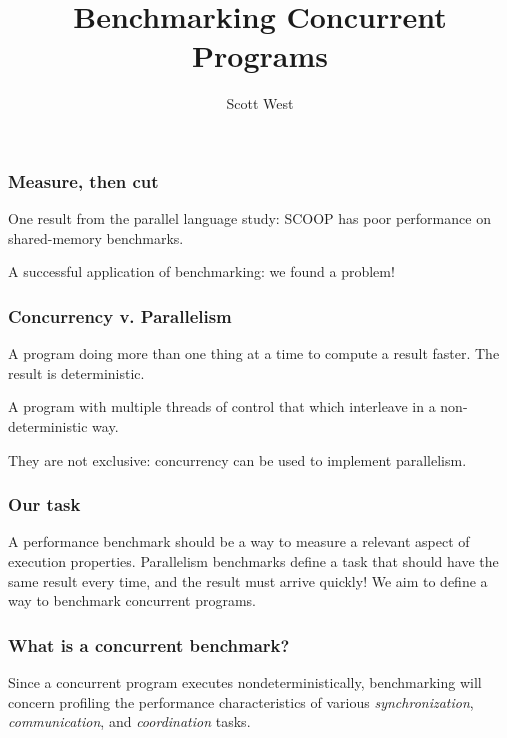 \documentclass{beamer}
\title{Benchmarking Concurrent Programs}
\author{Scott West}
\institute{ETH Z\"{u}rich}
\newcommand{\skipp}[0]{\vskip 0.5cm}
\newcommand{\skippause}[0]{\skipp \pause}
\begin{document}
\maketitle

\begin{frame}
  \frametitle{Measure, then cut}
  One result from the parallel language study:
  SCOOP has poor performance on shared-memory benchmarks.

  \skippause

  A successful application of benchmarking: we found a problem!
\end{frame}

\begin{frame}
  \frametitle{Concurrency v. Parallelism}
  \begin{definition}[Parallelism]
    A program doing more than one thing at a time to compute a result faster.
    The result is deterministic.
  \end{definition}

  \begin{definition}[Concurrency]
    A program with multiple threads of control that which 
    interleave in a non-deterministic way.
  \end{definition}

  They are not exclusive: concurrency can be used to implement parallelism.
\end{frame}

\begin{frame}
  \frametitle {Our task}
  A performance benchmark should be a way to measure a relevant aspect
  of execution properties.
  \skippause
  Parallelism benchmarks define a task that should have the same result
  every time, and the result must arrive quickly!
  \skippause
  We aim to define a way to benchmark concurrent programs.
\end{frame}

\begin{frame}
  \frametitle{What is a concurrent benchmark?}
  Since a concurrent program executes nondeterministically,
  benchmarking will concern profiling the performance characteristics
  of various \emph{synchronization}, \emph{communication}, and \emph{coordination} 
  tasks.
\end{frame}
\end{document}
